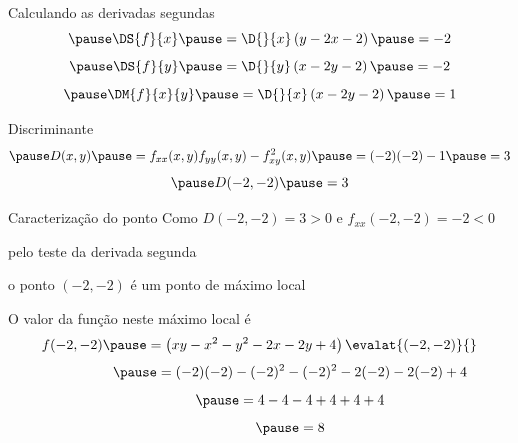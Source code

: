 \begin{resolution}{Calculando as derivadas segundas}
  \[
    \pause
    \DS{f}{x}
    \pause
    = \D{}{x}\left(y -2x -2\right)
    \pause
    = -2
  \]
  \[
    \pause
    \DS{f}{y}
    \pause
    = \D{}{y}\left(x -2y -2\right)
    \pause
    = -2
  \]
  \[
    \pause
    \DM{f}{x}{y}
    \pause
    = \D{}{x}\left(x -2y -2\right)
    \pause
    = 1
  \]

  \pause
  Discriminante
  \[
    \pause
    D(x, y)
    \pause
    = f_{xx}(x, y) f_{yy}(x, y) - f^2_{xy}(x, y)
    \pause
    = (-2)(-2) - 1
    \pause
    = 3
  \]
  \[
  \pause
    D(-2, -2)
    \pause
    = 3
  \]
\end{resolution}

\begin{resolution}{Caracterização do ponto}
  Como \(D(-2, -2)=3>0\)
  \pause
  \; e \;
  \(f_{xx}(-2, -2) = -2 < 0\)

  \pause
  pelo teste da derivada segunda

  \pause
  \bigskip
  o ponto \((-2, -2)\) é um ponto de máximo local

  \pause
  \bigskip
  O valor da função neste máximo local é
  \[
    f(-2, -2)
    \pause
    = \left(xy -x^2 - y^2 -2x -2y +4\right)\evalat{(-2, -2)}{}
  \]
  \[
    \hphantom{f(-2, -2)}
    \pause
    = (-2)(-2) - (-2)^2 - (-2)^2 -2(-2) -2(-2) + 4
  \]
  \[
    \hphantom{f(-2, -2)}
    \pause
    = 4 -4 -4 +4 +4 + 4
  \]
  \[
    \hphantom{f(-2, -2)}
    \pause
    = 8
  \]
\end{resolution}


